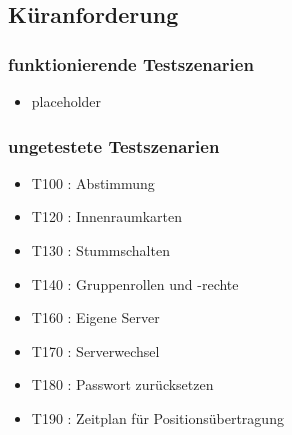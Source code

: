 \documentclass[parskip=full,11pt]{scrartcl}
\begin{document}
\subsection{Küranforderung}
	\subsubsection{funktionierende Testszenarien}
	\begin{itemize}
	\item placeholder
	\end{itemize}

	\subsubsection{ungetestete Testszenarien}
	\begin{itemize}
		\item T100 : Abstimmung
		\item T120 : Innenraumkarten
		\item T130 : Stummschalten
		\item T140 : Gruppenrollen und -rechte
		\item T160 : Eigene Server
		\item T170 : Serverwechsel
		\item T180 : Passwort zurücksetzen
		\item T190 : Zeitplan für Positionsübertragung
	\end{itemize}
\end{document}
